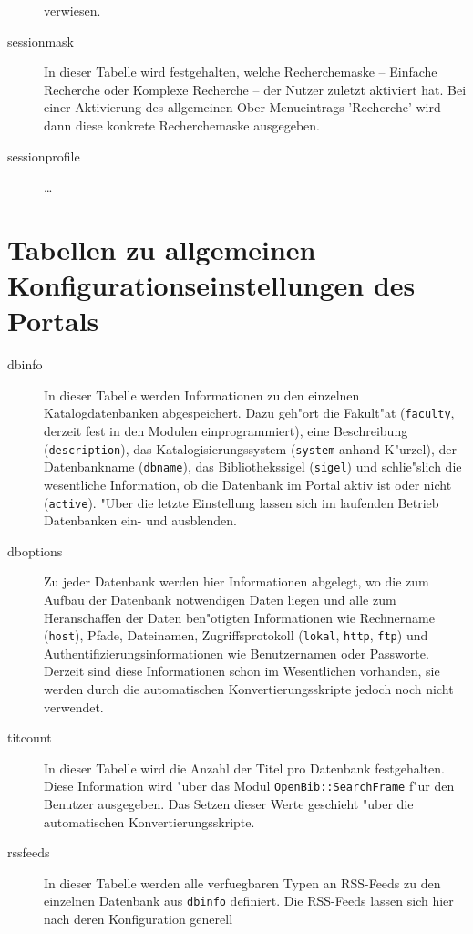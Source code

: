 \documentclass[11pt, twoside, a4paper, BCOR8mm, DIV12, bibtotoc,idxtotoc]{scrbook}
\begin{document}
\begin{description}
  verwiesen.
\item[sessionmask] In dieser Tabelle wird festgehalten, welche
  Recherchemaske -- Einfache Recherche oder Komplexe Recherche -- der
  Nutzer zuletzt aktiviert hat. Bei einer Aktivierung des allgemeinen
  Ober-Menueintrags 'Recherche' wird dann diese konkrete
  Recherchemaske ausgegeben.
\item[sessionprofile] \dots
\end{description}

\section{Tabellen zu allgemeinen Konfigurationseinstellungen des Portals}

\begin{description}
\item[dbinfo] In dieser Tabelle werden Informationen zu den einzelnen
  Katalogdatenbanken ab\-ge\-spei\-chert. Dazu geh"ort die Fakult"at
  (\texttt{faculty}, derzeit fest in den Modulen einprogrammiert),
  eine Beschreibung (\texttt{description}), das Katalogisierungssystem
  (\texttt{system} anhand K"urzel), der Datenbankname
  (\texttt{dbname}), das Bibliothekssigel (\texttt{sigel}) und
  schlie"slich die wesentliche Information, ob die Datenbank im Portal
  aktiv ist oder nicht (\texttt{active}). "Uber die letzte Einstellung
  lassen sich im laufenden Betrieb Datenbanken ein- und ausblenden.
\item[dboptions] Zu jeder Datenbank werden hier Informationen
  abgelegt, wo die zum Aufbau der Datenbank notwendigen Daten liegen
  und alle zum Heranschaffen der Daten ben"otigten Informationen wie
  Rechnername (\texttt{host}), Pfade, Dateinamen, Zugriffsprotokoll
  (\texttt{lokal}, \texttt{http}, \texttt{ftp}) und
  Authentifizierungsinformationen wie Benutzernamen oder Passworte.
  Derzeit sind diese Informationen schon im Wesentlichen vorhanden,
  sie werden durch die automatischen Konvertierungsskripte jedoch noch
  nicht verwendet.
\item[titcount] In dieser Tabelle wird die Anzahl der Titel pro
  Datenbank festgehalten. Diese Information wird "uber das Modul
  \texttt{OpenBib::SearchFrame} f"ur den Benutzer ausgegeben. Das Setzen
  dieser Werte geschieht "uber die automatischen
  Konvertierungsskripte.
\item[rssfeeds] In dieser Tabelle werden alle verfuegbaren Typen an RSS-Feeds
  zu den einzelnen Datenbank aus \texttt{dbinfo} definiert. Die
  RSS-Feeds lassen sich hier nach deren Konfiguration generell

\end{description}
\end{document}
